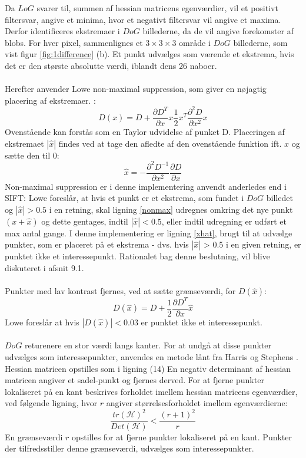 Da $LoG$ svarer til, summen af hessian matricens egenværdier, vil et positivt filtersvar, angive et minima, hvor et negativt filtersvar vil angive et maxima. Derfor identificeres ekstremaer i $DoG$ billederne, da de vil angive forekomster af blobs. For hver pixel, sammenlignes et $3\times3\times3$ område i $DoG$ billederne, som vist figur \ref{fig:1difference} (b). Et punkt udvælges som værende et ekstrema, hvis det er den største absolutte værdi, iblandt dens 26 naboer.
\\
\\
Herefter anvender Lowe non-maximal suppression, som giver en nøjagtig placering af ekstremaer. \cite{nonmaximalsuppression}:
\begin{equation}
D(x)=D+\dfrac{\partial D^T}{\partial x}x\dfrac{1}{2}x^T\dfrac{\partial^2D}{\partial x^2}x
\label{nonmax}
\end{equation}
Ovenstående kan forstås som en Taylor udvidelse af punket D.
Placeringen af ekstremaet $|\hat{x}|$ findes ved at tage den afledte af den ovenstående funktion ift. $x$ og sætte den til 0:
\begin{equation}
\hat{x}= -\dfrac{\partial^2 D^{-1}}{\partial x^2}\dfrac{\partial D}{\partial x}
\label{xhat}
\end{equation}
Non-maximal suppression er i denne implementering anvendt anderledes end i SIFT: Lowe foreslår, at hvis et punkt er et ekstrema, som fundet i $DoG$ billedet og $|\hat{x}| > 0.5$ i en retning, skal ligning \eqref{nonmax} udregnes omkring det nye punkt $(x+\hat{x})$ og dette gentages, indtil $|\hat{x}| < 0.5$, eller indtil udregning er udført et max antal gange. I denne implementering er ligning \eqref{xhat}, brugt til at udvælge punkter, som er placeret på et ekstrema - dvs. hvis $|\hat{x}|$ > 0.5 i en given retning, er punktet ikke et interessepunkt.  Rationalet bag denne beslutning, vil blive diskuteret i afsnit 9.1.
\\
\\
Punkter med lav kontrast fjernes, ved at sætte grænseværdi, for $D(\hat{x})$:
\begin{equation}
D(\hat{x})=D+\dfrac{1}{2}\dfrac{\partial D^T}{\partial x}\hat{x}
\label{dxhat}
\end{equation}
Lowe foreslår at hvis $|D(\hat{x})|<0.03$ er punktet ikke et interessepunkt. \\ \\
$DoG$ returenere en stor værdi langs kanter. For at undgå at disse punkter udvælges som interessepunkter, anvendes en metode lånt fra Harris og Stephens \cite{harris}. Hessian matricen opstilles som i ligning (14)
En negativ determinant af hessian matricen angiver et sadel-punkt og fjernes derved. For at fjerne punkter lokaliseret på en kant beskrives forholdet imellem hessian matricens egenværdier, ved følgende ligning, hvor $r$ angiver størrelsesforholdet imellem egenværdierne:
\begin{equation}
\dfrac{tr(\mathcal{H})^2}{Det(\mathcal{H})}<\dfrac{(r+1)^2}{r}
\label{rval}
\end{equation}
En grænseværdi $r$ opstilles for at fjerne punkter lokaliseret på en kant. Punkter der tilfredsstiller denne grænseværdi, udvælges som interessepunkter.
